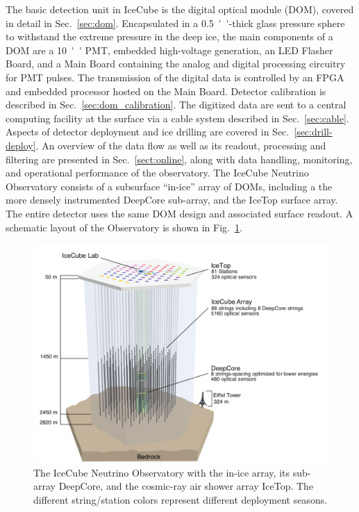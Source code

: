 The basic detection unit in IceCube is the
digital optical module (DOM), covered in detail in Sec.~\ref{sec:dom}.
Encapsulated in a \SI{0.5}{''}-thick glass pressure sphere 
to withstand the extreme pressure in the deep ice, the main components of a DOM
are a \SI{10}{''} PMT, embedded high-voltage generation, an LED Flasher 
Board, and a Main Board containing the analog and digital processing circuitry
for PMT pulses.  The transmission of the digital data is controlled by an FPGA
and embedded processor hosted on the Main Board. Detector calibration
is described in Sec.~\ref{sec:dom_calibration}. The digitized data are sent to a
central computing facility at the surface via a cable system described in
Sec.~\ref{sec:cable}.  Aspects of detector deployment and ice drilling are
covered in Sec.~\ref{sec:drill-deploy}. An overview of the data flow as well as
its readout, processing and filtering are presented in
Sec.~\ref{sect:online}, along with data handling, monitoring, and operational performance of
the observatory. The IceCube Neutrino Observatory consists of a subsurface
``in-ice'' array of DOMs, including a the more densely instrumented
DeepCore sub-array, and the IceTop surface array.  The entire detector
uses the same DOM design and associated surface readout. A schematic layout
of the Observatory is shown in Fig.~\ref{fig:array}. 

\begin{figure}[!h]
 \centering
 \includegraphics[width=\textwidth]{graphics/intro/ArrayWSeasonsLabels_crop.pdf}
 \caption{The IceCube Neutrino Observatory with the in-ice array, its sub-array DeepCore, and
   the cosmic-ray air shower array IceTop. The different string/station colors
   represent different deployment seasons.}
 \label{fig:array}
\end{figure}

